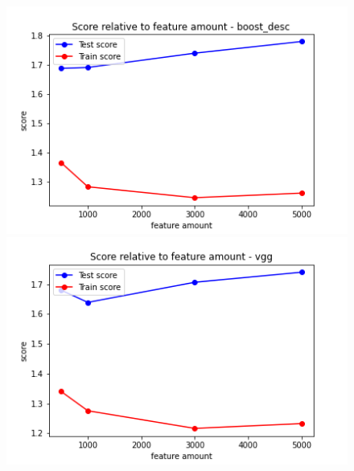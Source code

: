 \begin{figure}[H]
  \centering
  \begin{minipage}[b]{0.4\textwidth}
    \includegraphics[width=\textwidth]{images/2-LBM-feature_amount_boost_desc_large_values.png}
  \end{minipage}
  \hfill
  \begin{minipage}[b]{0.4\textwidth}
    \includegraphics[width=\textwidth]{images/2-LBM-feature_amount_vgg_large_values.png}
  \end{minipage}
\end{figure}

